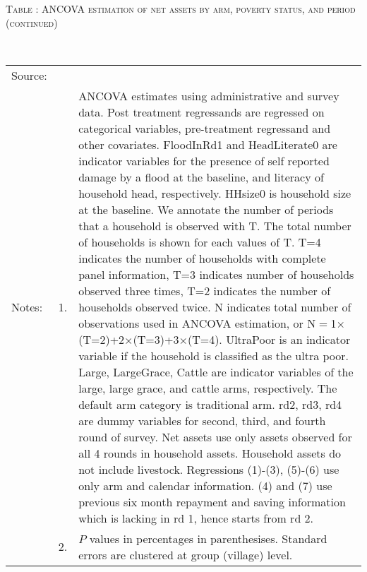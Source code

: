 \addtocounter{table}{-1}
\hspace{-1cm}\begin{minipage}[t]{14cm}
\hfil\textsc{\normalsize Table \thetable: ANCOVA estimation of net assets by arm, poverty status, and period (continued)\label{tab NetAssetsTimeVaryingPovertyStatusANCOVA2}}\\
\setlength{\tabcolsep}{1pt}
\setlength{\baselineskip}{8pt}
\renewcommand{\arraystretch}{.55}
\hfil{}\\
\renewcommand{\arraystretch}{.8}
\setlength{\tabcolsep}{1pt}
\begin{tabular}{>{\hfill\scriptsize}p{1cm}<{}>{\hfill\scriptsize}p{.25cm}<{}>{\scriptsize}p{12cm}<{\hfill}}
Source:& \multicolumn{2}{l}{\scriptsize Estimated with GUK administrative and survey data.}\\
Notes: & 1. & ANCOVA estimates using administrative and survey data. Post treatment regressands are regressed on categorical variables, pre-treatment regressand and other covariates. \textsf{FloodInRd1} and \textsf{HeadLiterate0} are indicator variables for the presence of self reported damage by a flood at the baseline, and literacy of household head, respectively. \textsf{HHsize0} is household size at the baseline. We annotate the number of periods that a household is observed with \textsf{T}. The total number of households is shown for each values of \textsf{T}. \textsf{T=4} indicates the number of households with complete panel information, \textsf{T=3} indicates number of households observed three times, \textsf{T=2} indicates the number of households observed twice. \textsf{N} indicates total number of observations used in ANCOVA estimation, or \textsf{N$=$1$\times$(T=2)+2$\times$(T=3)+3$\times$(T=4)}.  \textsf{UltraPoor} is an indicator variable if the household is classified as the ultra poor. \textsf{Large}, \textsf{LargeGrace}, \textsf{Cattle} are indicator variables of the \textsf{large}, \textsf{large grace}, and \textsf{cattle} arms, respectively. The default arm category is \textsf{traditional} arm. \textsf{rd2, rd3, rd4} are dummy variables for second, third, and fourth round of survey. Net assets use only assets observed for all 4 rounds in household assets. Household assets do not include livestock. Regressions (1)-(3), (5)-(6) use only arm and calendar information. (4) and (7) use previous six month repayment and saving information which is lacking in rd 1, hence starts from rd 2.\\
& 2. & $P$ values in percentages in parenthesises. Standard errors are clustered at group (village) level.
\end{tabular}
\end{minipage}


